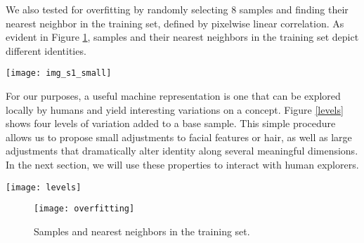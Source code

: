 \documentclass[10pt,letterpaper]{article}
\begin{document}
We also tested for overfitting by randomly selecting 8 samples and finding their nearest neighbor in the training set, defined by pixelwise linear correlation. As evident in Figure \ref{overfitting}, samples and their nearest neighbors in the training set depict different identities.

\begin{figure*}[!h]
  \begin{center}
    \texttt{[image: img\_s1\_small]}
  \vspace{-2mm}
  \caption{\textbf{a.} Decoded random samples drawn from the prior. \textbf{b.} Three decoded $7$-point linear interpolations between two random samples drawn from the prior.}
  \label{upsampled_samples}
  \end{center}
\end{figure*}

For our purposes, a useful machine representation is one that can be explored locally by humans and yield interesting variations on a concept. Figure \ref{levels} shows four levels of variation added to a base sample. This simple procedure allows us to propose small adjustments to facial features or hair, as well as large adjustments that dramatically alter identity along several meaningful dimensions. In the next section, we will use these properties to interact with human explorers.

\begin{figure*}[!ht]
  \begin{center}
    \texttt{[image: levels]}
  \vspace{-7mm}
  \caption{Latent noise perturbations at four levels of intensity.}
  \label{levels}
  \end{center}
  \vspace{-3mm}
\end{figure*}

\begin{figure}[!ht]
  \begin{center}
    \texttt{[image: overfitting]}
  \vspace{-3mm}
  \caption{Samples and nearest neighbors in the training set.}
  \label{overfitting}
  \end{center}
  \vspace{-7mm}
\end{figure}
\end{document}
